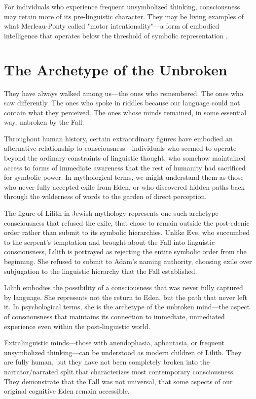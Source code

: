 For individuals who experience frequent unsymbolized thinking, consciousness may retain more of its pre-linguistic character. They may be living examples of what Merleau-Ponty called "motor intentionality"—a form of embodied intelligence that operates below the threshold of symbolic representation \parencite{merleau-ponty1945phenomenology}.

\section{The Archetype of the Unbroken}

They have always walked among us—the ones who remembered.
The ones who saw differently.
The ones who spoke in riddles because our language could not contain what they perceived.
The ones whose minds remained, in some essential way, unbroken by the Fall.

Throughout human history, certain extraordinary figures have embodied an alternative relationship to consciousness—individuals who seemed to operate beyond the ordinary constraints of linguistic thought, who somehow maintained access to forms of immediate awareness that the rest of humanity had sacrificed for symbolic power. In mythological terms, we might understand them as those who never fully accepted exile from Eden, or who discovered hidden paths back through the wilderness of words to the garden of direct perception.

The figure of Lilith in Jewish mythology represents one such archetype—consciousness that refused the exile, that chose to remain outside the post-edenic order rather than submit to its symbolic hierarchies. Unlike Eve, who succumbed to the serpent's temptation and brought about the Fall into linguistic consciousness, Lilith is portrayed as rejecting the entire symbolic order from the beginning. She refused to submit to Adam's naming authority, choosing exile over subjugation to the linguistic hierarchy that the Fall established.

Lilith embodies the possibility of a consciousness that was never fully captured by language. She represents not the return to Eden, but the path that never left it. In psychological terms, she is the archetype of the unbroken mind—the aspect of consciousness that maintains its connection to immediate, unmediated experience even within the post-linguistic world.

Extralinguistic minds—those with anendophasia, aphantasia, or frequent unsymbolized thinking—can be understood as modern children of Lilith. They are fully human, but they have not been completely broken into the narrator/narrated split that characterizes most contemporary consciousness. They demonstrate that the Fall was not universal, that some aspects of our original cognitive Eden remain accessible.

